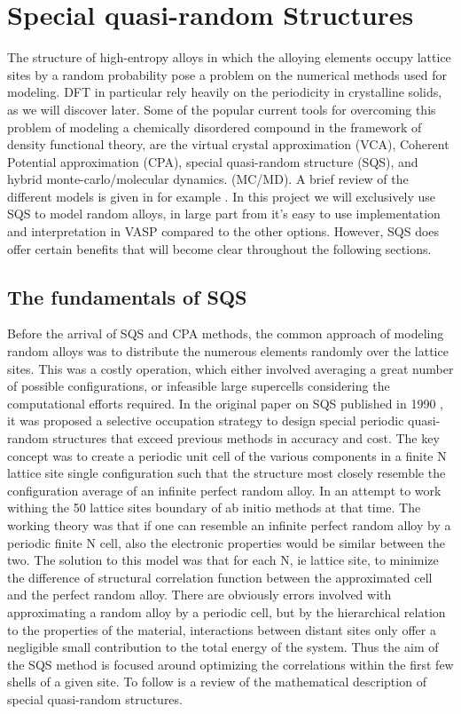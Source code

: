 \chapter{Special quasi-random Structures}
\label{sec:SQS}

The structure of high-entropy alloys in which the alloying elements occupy lattice sites by a random probability pose a problem on the numerical methods used for modeling. DFT in particular rely heavily on the periodicity in crystalline solids, as we will discover later. Some of the popular current tools for overcoming this problem of modeling a chemically disordered compound in the framework of density functional theory, are the virtual crystal approximation (VCA), Coherent Potential approximation (CPA), special quasi-random structure (SQS), and hybrid monte-carlo/molecular dynamics. (MC/MD). A brief review of the different models is given in for example \cite{sqsIntro}. In this project we will exclusively use SQS to model random alloys, in large part from it's easy to use implementation and interpretation in VASP compared to the other options. However, SQS does offer certain benefits that will become clear throughout the following sections.             

\section{The fundamentals of SQS}
Before the arrival of SQS and CPA methods, the common approach of modeling random alloys was to distribute the numerous elements randomly over the lattice sites. This was a costly operation, which either involved averaging a great number of possible configurations, or infeasible large supercells considering the computational efforts required. In the original paper on SQS published in 1990 \cite{sqsfull}, it was proposed a selective occupation strategy to design special periodic quasi-random structures that exceed previous methods in accuracy and cost. The key concept was to create a periodic unit cell of the various components in a finite N lattice site single configuration such that the structure most closely resemble the configuration average of an infinite perfect random alloy. In an attempt to work withing the 50 lattice sites boundary of ab initio methods at that time. The working theory was that if one can resemble an infinite perfect random alloy by a periodic finite N cell, also the electronic properties would be similar between the two. The solution to this model was that for each N, ie lattice site, to minimize the difference of structural correlation function between the approximated cell and the perfect random alloy. There are obviously errors involved with approximating a random alloy by a periodic cell, but by the hierarchical relation to the properties of the material, interactions between distant sites only offer a negligible small contribution to the total energy of the system. Thus the aim of the SQS method is focused around optimizing the correlations within the first few shells of a given site. To follow is a review of the mathematical description of special quasi-random structures.

